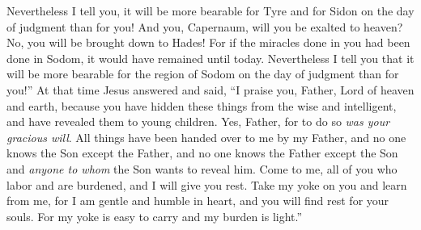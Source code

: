 \begin{biblechapter}
\verse Nevertheless I tell you, it will be more bearable for Tyre and for Sidon on the day of judgment than for you!
\verse And you, Capernaum, will you be exalted to heaven? No, you will be brought down to Hades! For if the miracles done in you had been done in Sodom, it would have remained until today.
\verse Nevertheless I tell you that it will be more bearable for the region of Sodom on the day of judgment than for you!”
 At that time Jesus answered and said, “I praise you, Father, Lord of heaven and earth, because you have hidden these things from the wise and intelligent, and have revealed them to young children.
\verse Yes, Father, for to do so \textit{was your gracious will}.
\verse All things have been handed over to me by my Father, and no one knows the Son except the Father, and no one knows the Father except the Son and \textit{anyone to whom} the Son wants to reveal him.
\verse Come to me, all of you who labor and are burdened, and I will give you rest.
\verse Take my yoke on you and learn from me, for I am gentle and humble in heart, and you will find rest for your souls.
\verse For my yoke is easy to carry and my burden is light.”
\end{biblechapter}

